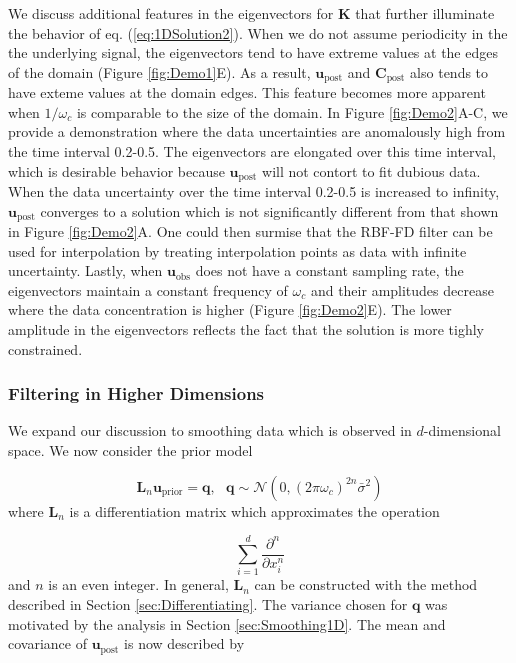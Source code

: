 \documentclass[10pt,a4paper]{article}
\begin{document}
We discuss additional features in the eigenvectors for $\mathbf{K}$ that further illuminate the behavior of eq. (\ref{eq:1DSolution2}).  When we do not assume periodicity in the the underlying signal, the eigenvectors tend to have extreme values at the edges of the domain (Figure \ref{fig:Demo1}E). As a result, $\mathbf{u}_\mathrm{post}$ and $\mathbf{C}_\mathrm{post}$ also tends to have exteme values at the domain edges.  This feature becomes more apparent when $1/\omega_c$ is comparable to the size of the domain.  In Figure \ref{fig:Demo2}A-C, we provide a demonstration where the data uncertainties are anomalously high from the time interval 0.2-0.5.  The eigenvectors are elongated over this time interval, which is desirable behavior because $\mathbf{u}_\mathrm{post}$ will not contort to fit dubious data.  When the data uncertainty over the time interval 0.2-0.5 is increased to infinity, $\mathbf{u}_\mathrm{post}$ converges to a solution which is not significantly different from that shown in Figure \ref{fig:Demo2}A.  One could then surmise that the RBF-FD filter can be used for interpolation by treating interpolation points as data with infinite uncertainty.  Lastly, when $\mathbf{u}_\mathrm{obs}$ does not have a constant sampling rate, the eigenvectors maintain a constant frequency of $\omega_c$ and their amplitudes decrease where the data concentration is higher (Figure \ref{fig:Demo2}E).  The lower amplitude in the eigenvectors reflects the fact that the solution is more tighly constrained.    

\subsubsection{Filtering in Higher Dimensions}\label{sec:SmoothingND} 
We expand our discussion to smoothing data which is observed in $d$-dimensional space. We now consider the prior model

\begin{equation}
  \mathbf{L}_n \mathbf{u}_\mathrm{prior} = \mathbf{q}, \ \ \ \mathbf{q} \sim \mathcal{N}(0,(2\pi\omega_c)^{2n}\bar{\sigma}^2)
\end{equation}  
where $\mathbf{L}_n$ is a differentiation matrix which approximates the operation 

\begin{equation}
  \sum_{i=1}^d\frac{\partial^n}{\partial x_i^n} 
\end{equation} 
and $n$ is an even integer. In general, $\mathbf{L}_n$ can be constructed with the method described in Section \ref{sec:Differentiating}.  The variance chosen for $\mathbf{q}$ was motivated by the analysis in Section \ref{sec:Smoothing1D}. The mean and covariance of $\mathbf{u}_\mathrm{post}$ is now described by
\end{document}
